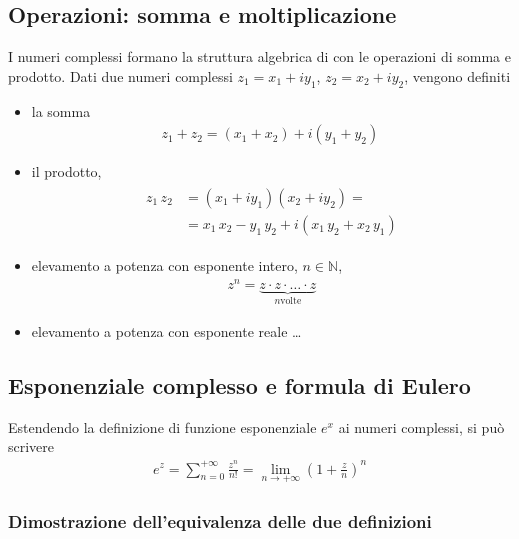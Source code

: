 \documentclass[letterpaper,10pt,italian]{jupyterBook}
\begin{document}
\subsection{Operazioni: somma e moltiplicazione}
\label{\detokenize{ch/algebra/complex-algebra:operazioni-somma-e-moltiplicazione}}
\sphinxAtStartPar
I numeri complessi formano la struttura algebrica di  con le operazioni di somma e prodotto. Dati due numeri complessi \(z_1 = x_1 + i y_1\), \(z_2 = x_2 + i y_2\), vengono definiti
\begin{itemize}
\item {} 
\sphinxAtStartPar
la somma
\begin{equation*}
\begin{split}z_1 + z_2 = (x_1 + x_2) + i (y_1 + y_2) \ \end{split}
\end{equation*}
\item {} 
\sphinxAtStartPar
il prodotto,
\begin{equation*}
\begin{split}\begin{aligned}
    z_1 \, z_2 & = (x_1 + i y_1) (x_2 + i y_2) = \\
    & = x_1 \, x_2 - y_1 \, y_2 + i ( x_1 \, y_2 + x_2 \, y_1 )
   \end{aligned}\end{split}
\end{equation*}
\item {} 
\sphinxAtStartPar
elevamento a potenza con esponente intero, \(n \in \mathbb{N}\),
\begin{equation*}
\begin{split}z^n = \underbrace{z \cdot z \cdot \dots \cdot z}_{n \text{volte}}\end{split}
\end{equation*}
\item {} 
\sphinxAtStartPar
elevamento a potenza con esponente reale  …

\end{itemize}


\subsection{Esponenziale complesso e formula di Eulero}
\label{\detokenize{ch/algebra/complex-algebra:esponenziale-complesso-e-formula-di-eulero}}
\sphinxAtStartPar
Estendendo la definizione di funzione esponenziale \(e^x\) ai numeri complessi, si può scrivere
\begin{equation*}
\begin{split}e^z = \sum_{n = 0}^{+\infty} \frac{z^n}{n!} = \lim_{n \rightarrow +\infty} \left( 1 + \frac{z}{n} \right)^n\end{split}
\end{equation*}\subsubsection*{Dimostrazione dell’equivalenza delle due definizioni}
\end{document}
